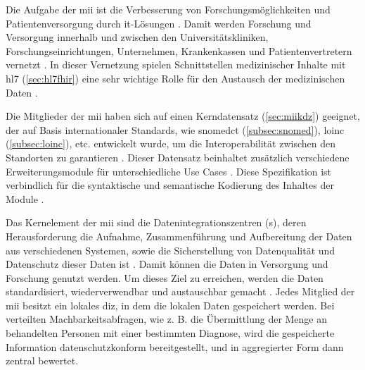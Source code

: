 Die Aufgabe der \ac{mii} ist die Verbesserung von Forschungsmöglichkeiten und Patientenversorgung durch \acs{it}-Lösungen \cite{mii}. Damit werden Forschung und Versorgung innerhalb und zwischen den Universitätskliniken, Forschungseinrichtungen, Unternehmen, Krankenkassen und Patientenvertretern vernetzt \cite{telemedizin, mii}. In dieser Vernetzung spielen Schnittstellen medizinischer Inhalte mit \acs{hl7} (\ref{sec:hl7fhir}) eine sehr wichtige Rolle für den Austausch der medizinischen Daten \cite{telemedizin}. 

Die Mitglieder der \ac{mii} haben sich auf einen Kerndatensatz (\ref{sec:miikdz}) geeignet, der auf Basis internationaler Standards, wie \ac{snomedct} (\ref{subsec:snomed}), \ac{loinc} (\ref{subsec:loinc}), etc. entwickelt wurde, um die Interoperabilität zwischen den Standorten zu garantieren \cite{telemedizin, miikdz}. Dieser Datensatz beinhaltet zusätzlich verschiedene Erweiterungsmodule für unterschiedliche Use Cases \cite{mii}. Diese Spezifikation ist verbindlich für die syntaktische und semantische Kodierung des Inhaltes der Module \cite{icukdz}.

Das Kernelement der \ac{mii} sind die Datenintegrationszentren (s), deren Herausforderung die Aufnahme, Zusammenführung und Aufbereitung der Daten aus verschiedenen Systemen, sowie die Sicherstellung von Datenqualität und Datenschutz dieser Daten ist \cite{mii, diz}. Damit können die Daten in Versorgung und Forschung genutzt werden. Um dieses Ziel zu erreichen, werden die Daten standardisiert, wiederverwendbar und austauschbar gemacht \cite{diz}. Jedes Mitglied der \ac{mii} besitzt ein lokales \ac{diz}, in dem die lokalen Daten gespeichert werden. Bei verteilten Machbarkeitsabfragen, wie z. B. die Übermittlung der Menge an behandelten Personen mit einer bestimmten Diagnose, wird die gespeicherte Information datenschutzkonform bereitgestellt, und in aggregierter Form dann zentral bewertet.